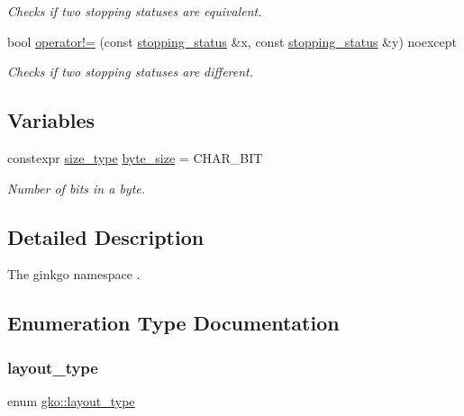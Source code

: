 \begin{DoxyCompactItemize}
\begin{DoxyCompactList}\small\item\em Checks if two stopping statuses are equivalent. \end{DoxyCompactList}\item 
bool \hyperlink{namespacegko_accf1dbf5054c76e154490d825b0f44ee}{operator!=} (const \hyperlink{classgko_1_1stopping__status}{stopping\+\_\+status} \&x, const \hyperlink{classgko_1_1stopping__status}{stopping\+\_\+status} \&y) noexcept
\begin{DoxyCompactList}\small\item\em Checks if two stopping statuses are different. \end{DoxyCompactList}\end{DoxyCompactItemize}
\subsection*{Variables}
\begin{DoxyCompactItemize}
\item 
\mbox{\label{namespacegko_acae2e648052ec788bd8ba9e0192652a6}} 
constexpr \hyperlink{namespacegko_a6e5c95df0ae4e47aab2f604a22d98ee7}{size\+\_\+type} \hyperlink{namespacegko_acae2e648052ec788bd8ba9e0192652a6}{byte\+\_\+size} = C\+H\+A\+R\+\_\+\+B\+IT
\begin{DoxyCompactList}\small\item\em Number of bits in a byte. \end{DoxyCompactList}\end{DoxyCompactItemize}


\subsection{Detailed Description}
The ginkgo namespace . 

\subsection{Enumeration Type Documentation}
\mbox{\label{namespacegko_ae749a5ea11a93c1bcc9158d9a6e9fb68}} 
\subsubsection{\texorpdfstring{layout\+\_\+type}{layout\_type}}
{\footnotesize\ttfamily enum \hyperlink{namespacegko_ae749a5ea11a93c1bcc9158d9a6e9fb68}{gko\+::layout\+\_\+type}\hspace{0.3cm}{\ttfamily [strong]}}



